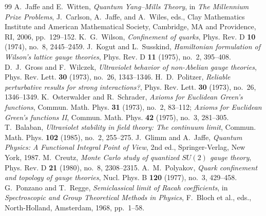 \documentclass[11pt,reqno]{article}
\begin{document}

\begin{thebibliography}{99}
 A.~Jaffe and E.~Witten, \emph{Quantum Yang--Mills Theory}, in \emph{The Millennium Prize Problems}, J.~Carlson, A.~Jaffe, and A.~Wiles, eds., Clay Mathematics Institute and American Mathematical Society, Cambridge, MA and Providence, RI, 2006, pp.~129--152.
 K.~G.~Wilson, \emph{Confinement of quarks}, Phys. Rev. D \textbf{10} (1974), no.~8, 2445--2459.
 J.~Kogut and L.~Susskind, \emph{Hamiltonian formulation of Wilson's lattice gauge theories}, Phys. Rev. D \textbf{11} (1975), no.~2, 395--408.
 D.~J.~Gross and F.~Wilczek, \emph{Ultraviolet behavior of non-Abelian gauge theories}, Phys. Rev. Lett. \textbf{30} (1973), no.~26, 1343--1346.
 H.~D.~Politzer, \emph{Reliable perturbative results for strong interactions?}, Phys. Rev. Lett. \textbf{30} (1973), no.~26, 1346--1349.
 K.~Osterwalder and R.~Schrader, \emph{Axioms for Euclidean Green's functions}, Commun. Math. Phys. \textbf{31} (1973), no.~2, 83--112; \emph{Axioms for Euclidean Green's functions II}, Commun. Math. Phys. \textbf{42} (1975), no.~3, 281--305.
 T.~Balaban, \emph{Ultraviolet stability in field theory: The continuum limit}, Commun. Math. Phys. \textbf{102} (1985), no.~2, 255--275.
 J.~Glimm and A.~Jaffe, \emph{Quantum Physics: A Functional Integral Point of View}, 2nd ed., Springer-Verlag, New York, 1987.
 M.~Creutz, \emph{Monte Carlo study of quantized $SU(2)$ gauge theory}, Phys. Rev. D \textbf{21} (1980), no.~8, 2308--2315.
 A.~M.~Polyakov, \emph{Quark confinement and topology of gauge theories}, Nucl. Phys. B \textbf{120} (1977), no.~3, 429--458.
 G.~Ponzano and T.~Regge, \emph{Semiclassical limit of Racah coefficients}, in \emph{Spectroscopic and Group Theoretical Methods in Physics}, F.~Bloch et al., eds., North-Holland, Amsterdam, 1968, pp.~1--58.
\end{thebibliography}
\end{document}
